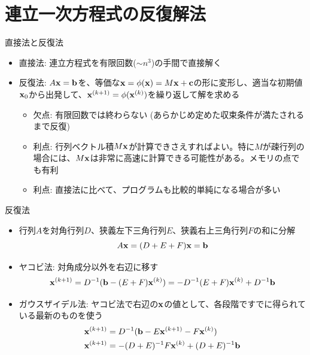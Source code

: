 \section{連立一次方程式の反復解法}

\begin{frame}[t,fragile]{直接法と反復法}
  \begin{itemize}
  \item 直接法: 連立方程式を有限回数($\sim n^3$)の手間で直接解く
  \item 反復法: $A{\bf x}={\bf b}$を、等価な${\bf x} = \phi({\bf x}) = M{\bf x} + {\bf c}$の形に変形し、適当な初期値${\bf x}_0$から出発して、${\bf x}^{(k+1)} = \phi({\bf x}^{(k)})$を繰り返して解を求める
    \begin{itemize}
    \item 欠点: 有限回数では終わらない (あらかじめ定めた収束条件が満たされるまで反復)
    \item 利点: 行列ベクトル積$M{\bf x}$が計算できさえすればよい。特に$M$が疎行列の場合には、$M{\bf x}$は非常に高速に計算できる可能性がある。メモリの点でも有利
    \item 利点: 直接法に比べて、プログラムも比較的単純になる場合が多い
    \end{itemize}
  \end{itemize}
\end{frame}

\begin{frame}[t,fragile]{反復法}
  \begin{itemize}
  \item 行列$A$を対角行列$D$、狭義左下三角行列$E$、狭義右上三角行列$F$の和に分解
    \[
    A{\bf x} = (D + E + F){\bf x} = {\bf b}
    \]
  \item ヤコビ法: 対角成分以外を右辺に移す
    \[
      {\bf x}^{(k+1)} = D^{-1} ({\bf b} - (E+F) {\bf x}^{(k)}) = -D^{-1}(E+F){\bf x}^{(k)} + D^{-1} {\bf b}
      \]
    \item ガウスザイデル法: ヤコビ法で右辺の${\bf x}$の値として、各段階ですでに得られている最新のものを使う
    \begin{align*}
      {\bf x}^{(k+1)} &= D^{-1} ({\bf b} - E{\bf x}^{(k+1)} - F{\bf x}^{(k)}) \\
      {\bf x}^{(k+1)} &= -(D+E)^{-1} F{\bf x}^{(k)} + (D+E)^{-1}{\bf b}
    \end{align*}
  \end{itemize}
\end{frame}


